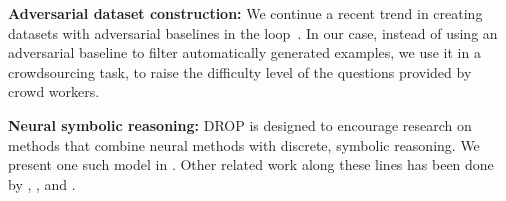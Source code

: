 \textbf{Adversarial dataset construction:} We continue a recent trend in creating datasets with adversarial baselines in the loop~\citep{Paperno2016TheLD,Minervini2018AdversariallyRN,Zellers2018SWAGAL,Zhang2018ReCoRDBT,zellers2018VCR}.  In our case, instead of using an adversarial baseline to filter automatically generated examples, we use it in a crowdsourcing task, to raise the difficulty level of the questions provided by crowd workers.

\textbf{Neural symbolic reasoning:} DROP is designed to encourage research on methods that combine neural methods with discrete, symbolic reasoning.  We present one such model in .  Other related work along these lines has been done by \citet{Reed2015NeuralP}, \citet{Neelakantan2015NeuralPI}, and \citet{Liang2017NeuralSM}.